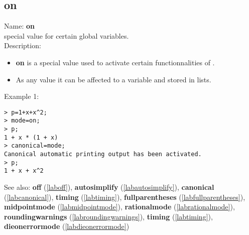 \subsection{on}
\label{labon}
\noindent Name: \textbf{on}\\
special value for certain global variables.\\
\noindent Description: \begin{itemize}

\item \textbf{on} is a special value used to activate certain functionnalities 
   of \sollya.

\item As any value it can be affected to a variable and stored in lists.
\end{itemize}
\noindent Example 1: 
\begin{center}\begin{minipage}{15cm}\begin{Verbatim}[frame=single]
> p=1+x+x^2;
> mode=on;
> p;
1 + x * (1 + x)
> canonical=mode;
Canonical automatic printing output has been activated.
> p;
1 + x + x^2
\end{Verbatim}
\end{minipage}\end{center}
See also: \textbf{off} (\ref{laboff}), \textbf{autosimplify} (\ref{labautosimplify}), \textbf{canonical} (\ref{labcanonical}), \textbf{timing} (\ref{labtiming}), \textbf{fullparentheses} (\ref{labfullparentheses}), \textbf{midpointmode} (\ref{labmidpointmode}), \textbf{rationalmode} (\ref{labrationalmode}), \textbf{roundingwarnings} (\ref{labroundingwarnings}), \textbf{timing} (\ref{labtiming}), \textbf{dieonerrormode} (\ref{labdieonerrormode})
